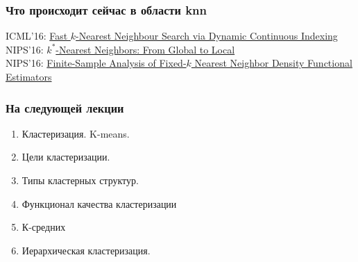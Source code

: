 \documentclass[10pt]{beamer}
\begin{document}
\begin{frame}\frametitle{Что происходит сейчас в области knn}
  ICML'16: \href{http://jmlr.org/proceedings/papers/v48/lic16.pdf}{Fast $k$-Nearest Neighbour Search via Dynamic Continuous Indexing}\\
  \bigbreak
  NIPS'16: \href{http://papers.nips.cc/paper/6373-k-nearest-neighbors-from-global-to-local.pdf}{$k^\ast$-Nearest Neighbors: From Global to Local}\\
  \bigbreak
  NIPS'16: \href{http://papers.nips.cc/paper/6123-finite-sample-analysis-of-fixed-k-nearest-neighbor-density-functional-estimators.pdf}{Finite-Sample Analysis of Fixed-$k$ Nearest Neighbor Density Functional Estimators}\\
\end{frame}

\begin{frame}\frametitle{На следующей лекции}
	\begin{enumerate} [--]
		\item Кластеризация.  K-means.
		\item Цели кластеризации.
		\item Типы кластерных структур.
		\item Функционал качества кластеризации
		\item К-средних
		\item Иерархическая кластеризация.
	\end{enumerate}
\end{frame}
\end{document}
